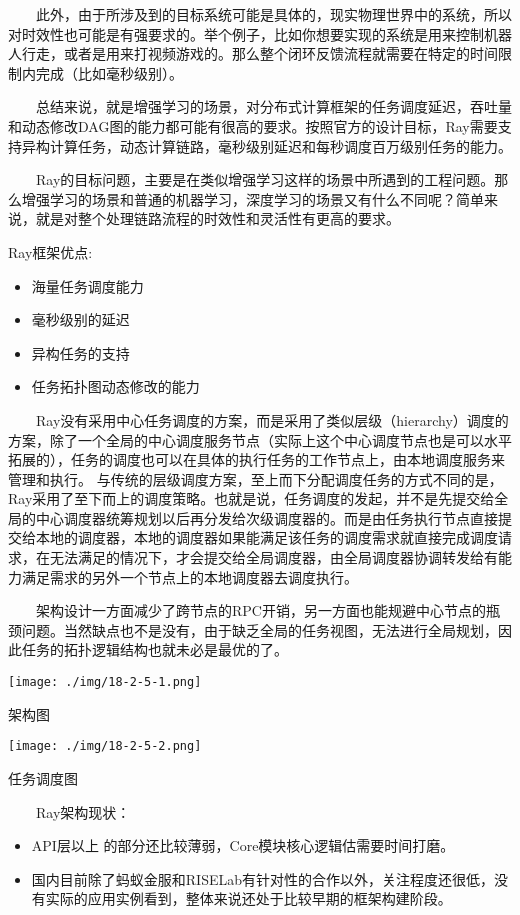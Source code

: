   此外，由于所涉及到的目标系统可能是具体的，现实物理世界中的系统，所以对时效性也可能是有强要求的。举个例子，比如你想要实现的系统是用来控制机器人行走，或者是用来打视频游戏的。那么整个闭环反馈流程就需要在特定的时间限制内完成（比如毫秒级别）。

  总结来说，就是增强学习的场景，对分布式计算框架的任务调度延迟，吞吐量和动态修改DAG图的能力都可能有很高的要求。按照官方的设计目标，Ray需要支持异构计算任务，动态计算链路，毫秒级别延迟和每秒调度百万级别任务的能力。

  Ray的目标问题，主要是在类似增强学习这样的场景中所遇到的工程问题。那么增强学习的场景和普通的机器学习，深度学习的场景又有什么不同呢？简单来说，就是对整个处理链路流程的时效性和灵活性有更高的要求。

Ray框架优点:

\begin{itemize}
\item
  海量任务调度能力
\item
  毫秒级别的延迟
\item
  异构任务的支持
\item
  任务拓扑图动态修改的能力
\end{itemize}

  Ray没有采用中心任务调度的方案，而是采用了类似层级（hierarchy）调度的方案，除了一个全局的中心调度服务节点（实际上这个中心调度节点也是可以水平拓展的），任务的调度也可以在具体的执行任务的工作节点上，由本地调度服务来管理和执行。
与传统的层级调度方案，至上而下分配调度任务的方式不同的是，Ray采用了至下而上的调度策略。也就是说，任务调度的发起，并不是先提交给全局的中心调度器统筹规划以后再分发给次级调度器的。而是由任务执行节点直接提交给本地的调度器，本地的调度器如果能满足该任务的调度需求就直接完成调度请求，在无法满足的情况下，才会提交给全局调度器，由全局调度器协调转发给有能力满足需求的另外一个节点上的本地调度器去调度执行。

  架构设计一方面减少了跨节点的RPC开销，另一方面也能规避中心节点的瓶颈问题。当然缺点也不是没有，由于缺乏全局的任务视图，无法进行全局规划，因此任务的拓扑逻辑结构也就未必是最优的了。

\texttt{[image: ./img/18-2-5-1.png]}

架构图

\texttt{[image: ./img/18-2-5-2.png]}

任务调度图

  Ray架构现状：

\begin{itemize}
\item
  API层以上 的部分还比较薄弱，Core模块核心逻辑估需要时间打磨。
\item
  国内目前除了蚂蚁金服和RISELab有针对性的合作以外，关注程度还很低，没有实际的应用实例看到，整体来说还处于比较早期的框架构建阶段。
\end{itemize}

